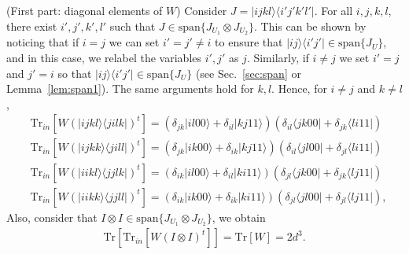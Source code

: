 \documentclass[a4paper,twocolumn,accepted=2022-10-23]{quantumarticle}
\newcommand{\bra}[1]{\langle {#1} \vert}
\newcommand{\ket}[1]{\vert {#1} \rangle}
\newcommand{\ketbra}[2]{\vert {#1} \rangle\!\langle {#2} \vert}
\newcommand{\Tr}[0]{{\mathrm{Tr}}}
\theoremstyle{definition}
\begin{document}
(First part: diagonal elements of $W$)\quad
Consider $J = \ketbra{ijkl}{i'j'k'l'}$.
For all $i,j,k,l$, there exist $i',j',k',l'$ such that $J \in \mathrm{span} \{ J_{U_1} \otimes J_{U_2} \}$.
This can be shown by noticing that if $i=j$ we can set $i'=j'\neq i$ to ensure that $\ketbra{ij}{i'j'} \in \mathrm{span} \{ J_U \}$, and in this case, we relabel the variables $i',j'$ as $j$.
Similarly, if $i \neq j$ we set $i'=j$ and $j'=i$ so that $\ketbra{ij}{i'j'} \in \mathrm{span} \{ J_U \}$ (see Sec.~\ref{sec:span} or Lemma~\ref{lem:span1}).
The same arguments hold for $k,l$.  Hence, for $ i \neq j$ and $k \neq l$, 
\begin{align}
&\Tr_{in} [W (\ketbra{ijkl}{jilk})^t]
= ( \delta_{jk} \ket{il00} + \delta_{il} \ket{kj11} ) ( \delta_{il} \bra{jk00} + \delta_{jk} \bra{li11}  ) \label{eq:unique_w_action1} \\
&\Tr_{in} [W (\ketbra{ijkk}{jill})^t] 
= ( \delta_{jk} \ket{ik00} + \delta_{ik} \ket{kj11} ) ( \delta_{il} \bra{jl00} + \delta_{jl} \bra{li11}  ) \label{eq:unique_w_action2} \\
&\Tr_{in} [W (\ketbra{iikl}{jjlk})^t]
= ( \delta_{ik} \ket{il00} + \delta_{il} \ket{ki11} ) ( \delta_{jl} \bra{jk00} + \delta_{jk} \bra{lj11}  ) \label{eq:unique_w_action3} \\
&\Tr_{in} [W (\ketbra{iikk}{jjll})^t]
= ( \delta_{ik} \ket{ik00} + \delta_{ik} \ket{ki11} ) ( \delta_{jl} \bra{jl00} + \delta_{jl} \bra{lj11}  ), \label{eq:unique_w_action4}
\end{align}
Also, consider that $I \otimes I \in \mathrm{span} \{ J_{U_1} \otimes J_{U_2} \}$,
we obtain
\begin{gather}
\Tr [\Tr_{in} [W (I \otimes I)^t]] = \Tr [W] = 2 d^3. \label{eq:unique_w_action5}
\end{gather}
\end{document}
